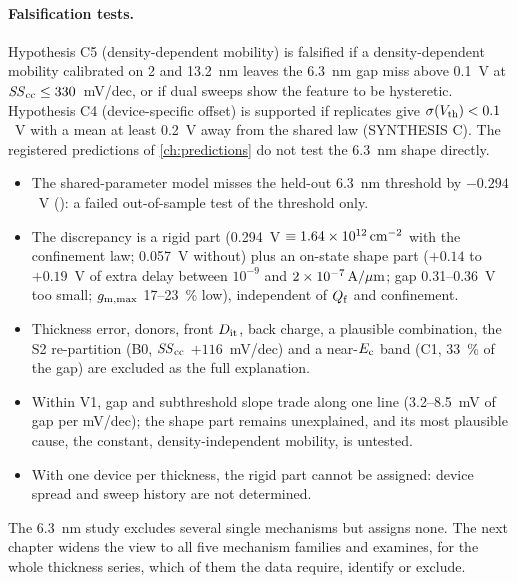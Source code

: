 \paragraph{Falsification tests.} Hypothesis C5 (density-dependent mobility) is falsified if a density-dependent mobility calibrated on 2 and 13.2~nm leaves the 6.3~nm gap miss above 0.1~V at $\mathit{SS}_{\mathrm{cc}}\le330$~mV/dec, or if dual sweeps show the feature to be hysteretic. Hypothesis C4 (device-specific offset) is supported if replicates give $\sigma(V_{\mathrm{th}})<0.1$~V with a mean at least 0.2~V away from the shared law (SYNTHESIS C). The registered predictions of \cref{ch:predictions} do not test the 6.3~nm shape directly.

\begin{keyresult}
\begin{itemize}
\item The shared-parameter model misses the held-out 6.3~nm threshold by $-0.294$~V (): a failed out-of-sample test of the threshold only.
\item The discrepancy is a rigid part (0.294~V $\equiv1.64\times10^{12}\,\mathrm{cm}^{-2}$ with the confinement law; 0.057~V without) plus an on-state shape part ($+0.14$ to $+0.19$~V of extra delay between $10^{-9}$ and $2\times10^{-7}\,\mathrm{A}/\mu\mathrm{m}$; gap 0.31--0.36~V too small; $g_{\mathrm{m,max}}$ 17--23~\% low), independent of $Q_{\mathrm{f}}$ and confinement.
\item Thickness error, donors, front $D_{\mathrm{it}}$, back charge, a plausible combination, the S2 re-partition (B0, $\mathit{SS}_{\mathrm{cc}}$ $+116$~mV/dec) and a near-$E_{\mathrm{c}}$ band (C1, 33~\% of the gap) are excluded as the full explanation.
\item Within V1, gap and subthreshold slope trade along one line (3.2--8.5~mV of gap per mV/dec); the shape part remains unexplained, and its most plausible cause, the constant, density-independent mobility, is untested.
\item With one device per thickness, the rigid part cannot be assigned: device spread and sweep history are not determined.
\end{itemize}
\end{keyresult}

The 6.3~nm study excludes several single mechanisms but assigns none. The next chapter widens the view to all five mechanism families and examines, for the whole thickness series, which of them the data require, identify or exclude.
